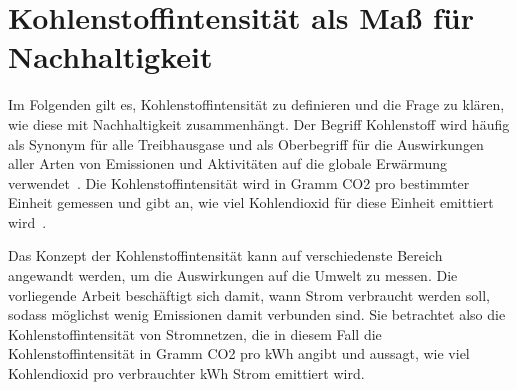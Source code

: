 %

\section{Kohlenstoffintensität als Maß für Nachhaltigkeit}\label{CAP:ci}
Im Folgenden gilt es, Kohlenstoffintensität zu definieren und die Frage zu klären, wie diese mit Nachhaltigkeit zusammenhängt.
Der Begriff Kohlenstoff wird häufig als Synonym für alle Treibhausgase und als Oberbegriff für die Auswirkungen aller Arten von Emissionen und Aktivitäten auf die globale Erwärmung verwendet~\cite{GreenSoftwareFoundation.2022}.
Die Kohlenstoffintensität wird in Gramm \ac{CO2} pro bestimmter Einheit gemessen und gibt an, wie viel Kohlendioxid für diese Einheit emittiert wird~\cite{LyndonRuff.20220420T15:34:17.000Z}.

Das Konzept der Kohlenstoffintensität kann auf verschiedenste Bereich angewandt werden, um die Auswirkungen auf die Umwelt zu messen.
Die vorliegende Arbeit beschäftigt sich damit, wann Strom verbraucht werden soll, sodass möglichst wenig Emissionen damit verbunden sind.
Sie betrachtet also die Kohlenstoffintensität von Stromnetzen, die in diesem Fall die Kohlenstoffintensität in Gramm \ac{CO2} pro \ac{kWh} angibt und aussagt, wie viel Kohlendioxid pro verbrauchter \ac{kWh} Strom emittiert wird.

